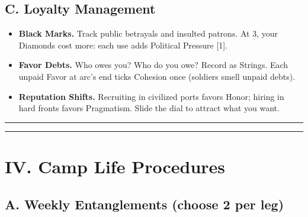 \documentclass[11pt]{article}
\begin{document}
\subsection*{C. Loyalty Management}
\begin{itemize}
    \item \textbf{Black Marks.} Track public betrayals and insulted patrons. At 3, your Diamonds cost more: each use adds Political Pressure [1].
    \item \textbf{Favor Debts.} Who owes you? Who do you owe? Record as Strings. Each unpaid Favor at arc's end ticks Cohesion once (soldiers smell unpaid debts).
    \item \textbf{Reputation Shifts.} Recruiting in civilized ports favors Honor; hiring in hard fronts favors Pragmatism. Slide the dial to attract what you want.
\end{itemize}

\rule{\textwidth}{0.4pt}


\rule{\textwidth}{0.4pt}

\section*{IV. Camp Life Procedures}

\subsection*{A. Weekly Entanglements (choose 2 per leg)}
\end{document}

